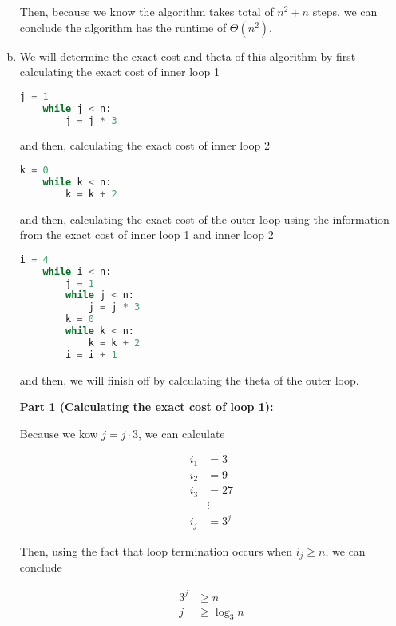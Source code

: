 \documentclass[12pt]{article}
\begin{document}
\begin{enumerate}[a.]
    \bigskip

    Then, because we know the algorithm takes total of $n^2 + n$ steps,
    we can conclude the algorithm has the runtime of $\Theta(n^2)$.

    \item

    We will determine the exact cost and theta of this algorithm by first
    calculating the exact cost of inner loop 1

    \begin{lstlisting}[language=Python]
    j = 1
    while j < n:
        j = j * 3
    \end{lstlisting}

    and then, calculating the exact cost of inner loop 2

    \begin{lstlisting}[language=Python]
    k = 0
    while k < n:
        k = k + 2
    \end{lstlisting}

    and then, calculating the exact cost of the outer loop using the information
    from the exact cost of inner loop 1 and inner loop 2

    \begin{lstlisting}[language=Python]
    i = 4
    while i < n:
        j = 1
        while j < n:
            j = j * 3
        k = 0
        while k < n:
            k = k + 2
        i = i + 1
    \end{lstlisting}

    and then, we will finish off by calculating the theta of the outer loop.

    \bigskip

    \textbf{Part 1 (Calculating the exact cost of loop 1):}

    \bigskip

    Because we kow $j = j \cdot 3$, we can calculate

    \begin{align*}
        i_1 &= 3\\
        i_2 &= 9\\
        i_3 &= 27\\
        &\vdots\\
        i_j &= 3^j
    \end{align*}

    \bigskip

    Then, using the fact that loop termination occurs when $i_j \geq n$, we can
    conclude

    \setcounter{equation}{0}
    \begin{align}
        3^j &\geq n\\
        j &\geq \log_3 n
    \end{align}


\end{enumerate}
\end{document}
